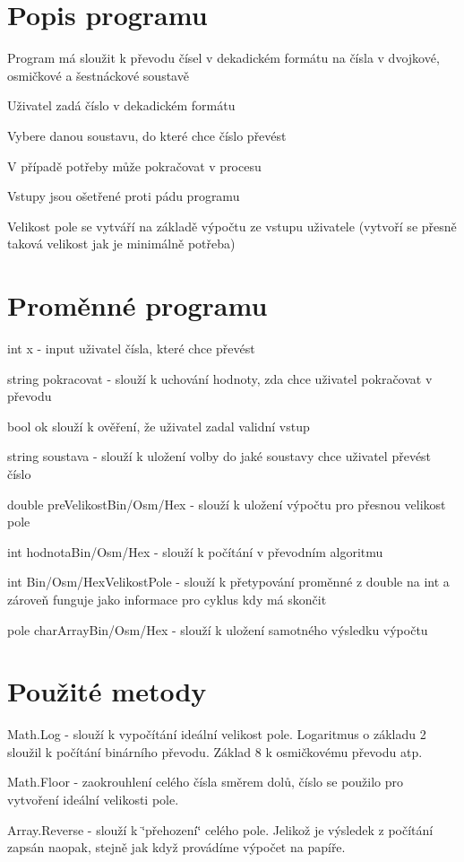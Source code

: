 \hypertarget{index_main}{}\section{Popis programu}\label{index_main}
Program má sloužit k převodu čísel v dekadickém formátu na čísla v dvojkové, osmičkové a šestnáckové soustavě
\begin{DoxyItemize}
\item Uživatel zadá číslo v dekadickém formátu
\item Vybere danou soustavu, do které chce číslo převést
\item V případě potřeby může pokračovat v procesu
\item Vstupy jsou ošetřené proti pádu programu
\item Velikost pole se vytváří na základě výpočtu ze vstupu uživatele (vytvoří se přesně taková velikost jak je minimálně potřeba)
\end{DoxyItemize}\hypertarget{index_variables}{}\section{Proměnné programu}\label{index_variables}

\begin{DoxyItemize}
\item int x -\/ input uživatel čísla, které chce převést
\item string pokracovat -\/ slouží k uchování hodnoty, zda chce uživatel pokračovat v převodu
\item bool ok slouží k ověření, že uživatel zadal validní vstup
\item string soustava -\/ slouží k uložení volby do jaké soustavy chce uživatel převést číslo
\item double pre\+Velikost\+Bin/\+Osm/\+Hex -\/ slouží k uložení výpočtu pro přesnou velikost pole
\item int hodnota\+Bin/\+Osm/\+Hex -\/ slouží k počítání v převodním algoritmu
\item int Bin/\+Osm/\+Hex\+Velikost\+Pole -\/ slouží k přetypování proměnné z double na int a zároveň funguje jako informace pro cyklus kdy má skončit
\item pole char\+Array\+Bin/\+Osm/\+Hex -\/ slouží k uložení samotného výsledku výpočtu
\end{DoxyItemize}\hypertarget{index_methods}{}\section{Použité metody}\label{index_methods}

\begin{DoxyItemize}
\item Math.\+Log -\/ slouží k vypočítání ideální velikost pole. Logaritmus o základu 2 sloužil k počítání binárního převodu. Základ 8 k osmičkovému převodu atp.
\item Math.\+Floor -\/ zaokrouhlení celého čísla směrem dolů, číslo se použilo pro vytvoření ideální velikosti pole.
\item Array.\+Reverse -\/ slouží k \char`\"{}přehození\char`\"{} celého pole. Jelikož je výsledek z počítání zapsán naopak, stejně jak když provádíme výpočet na papíře. 
\end{DoxyItemize}